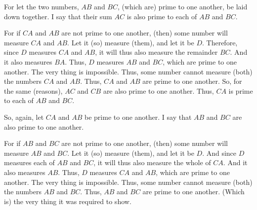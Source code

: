 \begin{Parallel}{}{}
{\epsfysize=0.7in
\centerline{}

For let the two numbers, $AB$ and $BC$, (which are) prime to one another,
be laid down together. I say that their sum $AC$ is also prime to each of
$AB$ and $BC$.

For if $CA$ and $AB$ are not prime to one another, (then) some number
will measure $CA$ and $AB$. Let it (so) measure (them), and let it be $D$.
Therefore, since $D$ measures $CA$ and $AB$, it will thus also measure the remainder
$BC$. And it also measures $BA$. Thus, $D$ measures $AB$ and $BC$, which are
prime to one another. The very thing is impossible. Thus, some number cannot measure (both) the numbers $CA$ and $AB$. Thus, $CA$ and $AB$ are prime to
one another. So, for the same (reasons), $AC$ and $CB$ are also prime to one another. Thus, $CA$ is prime to each of $AB$ and $BC$.

So, again, let $CA$ and $AB$  be prime to one another. I say that $AB$ and $BC$
are also prime to one another.

For if $AB$ and $BC$ are not prime to one another, (then) some number will measure $AB$ and $BC$. Let it (so) measure (them), and let it be $D$. And since
$D$ measures each of $AB$ and $BC$, it will thus also measure the whole
of $CA$. And it also measures $AB$. Thus, $D$ measures $CA$ and $AB$, which are
prime to one another. The very thing is impossible. Thus, some number
cannot measure (both) the numbers $AB$ and $BC$. Thus, $AB$ and $BC$ are prime
to one another. (Which is) the very thing it was required to show.}
\end{Parallel}


